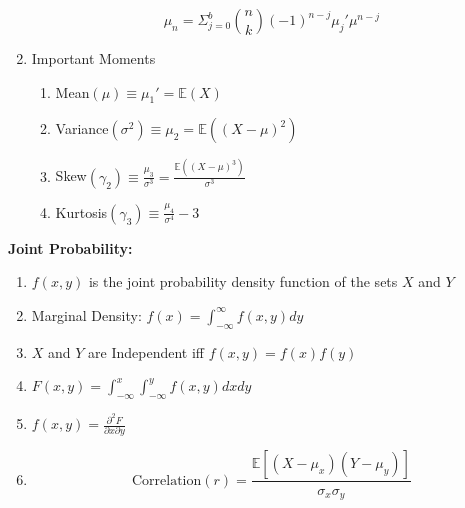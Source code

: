 \documentclass[12pt]{article}
\renewcommand{\=}[1]{\stackrel{#1}{=}} %
\theoremstyle{definition}
\theoremstyle{remark}
\begin{document}
\begin{enumerate}
\begin{equation}
      \mu_n = \Sigma_{j=0}^b\binom{n}{k}(-1)^{n-j}\mu_j'\mu^{n-j}
    \end{equation}
  \item Important Moments
    \begin{enumerate}
    \item Mean$(\mu) \equiv \mu_1' = \mathbb{E}(X)$
    \item Variance$(\sigma^2) \equiv \mu_2 = \mathbb{E}((X-\mu)^2)$
    \item Skew$(\gamma_2) \equiv \frac{\mu_3}{\sigma^3} = \frac{\mathbb{E}((X-\mu)^3)}{\sigma^3}$
    \item Kurtosis$(\gamma_3) \equiv \frac{\mu_4}{\sigma^4} -3$
    \end{enumerate}
  \end{enumerate}

  \newpage
  \textbf{Joint Probability:}
  \begin{enumerate}
  \item $f(x,y)$ is the joint probability density function of the sets
    $X$ and $Y$
  \item Marginal Density: $f(x) = \int_{-\infty}^{\infty}f(x,y)dy$
  \item $X$ and $Y$ are Independent iff $f(x,y) = f(x)f(y)$
  \item $F(x,y) = \int_{-\infty}^{x}\int_{-\infty}^{y}f(x,y)dxdy$
  \item $f(x,y) = \frac{\partial^2 F}{\partial x \partial y}$
  \item
    \begin{equation}
      \textrm{Correlation}(r) =
    \frac{\mathbb{E}[(X-\mu_x)(Y-\mu_y)]}{\sigma_x \sigma_y}
    \end{equation}
  \end{enumerate}
\end{document}
